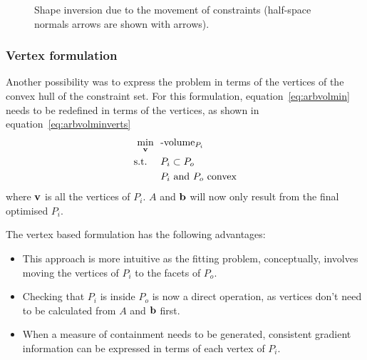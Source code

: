 \begin{figure}[htbp]
  \centering
  \scalebox{1}{}  
  \caption[Shape inversion example]{Shape inversion due to the movement of constraints (half-space normals arrows are shown with arrows).}
  \label{fig:shapeinversion}
\end{figure}

\subsubsection{Vertex formulation}
Another possibility was to express the problem in terms of the vertices of the convex hull of the constraint set.
For this formulation, equation~\ref{eq:arbvolmin} needs to be redefined in terms of the vertices, as shown in equation~\ref{eq:arbvolminverts}
\begin{align}
  \label{eq:arbvolminverts}
    \min_{{\bf {v}}}~~&\text{-volume}_{P_i}\\
    \text{s.t.}~~~~ &P_i \subset P_o \notag \\
                    &P_i \text{~and~} P_o \text{~convex} \notag
\end{align}
where ${\bf {v}}$ is all the vertices of $P_i$.
$A$ and ${\bf {b}}$ will now only result from the final optimised $P_i$.

The vertex based formulation has the following advantages:
\begin{itemize}
  \item This approach is more intuitive as the fitting problem, conceptually, involves moving the vertices of $P_i$ to the facets of $P_o$.
  \item Checking that $P_i$ is inside $P_o$ is now a direct operation, as vertices don't need to be calculated from $A$ and ${\bf {b}}$ first.
  \item When a measure of containment needs to be generated, consistent gradient information can be expressed in terms of each vertex of $P_i$.
\end{itemize}

